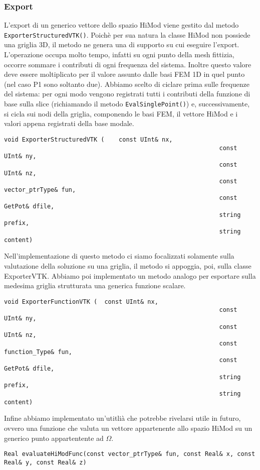 \subsubsection{Export}

L'export di un generico vettore dello spazio HiMod viene gestito dal metodo \texttt{ExporterStructuredVTK()}. Poich\`e  per sua natura la classe HiMod non possiede una griglia 3D,  il metodo ne genera una di supporto su cui eseguire l'export. 
L'operazione occupa molto tempo, infatti su ogni punto della mesh fittizia, 
occorre sommare i contributi di ogni frequenza del sistema. 
Inoltre questo valore deve essere moltiplicato per il valore assunto dalle basi FEM 1D in quel punto (nel caso P1 sono soltanto due).
Abbiamo scelto di ciclare prima sulle frequenze del sistema: per ogni modo vengono registrati 
tutti i contributi della funzione di base sulla slice (richiamando il metodo \texttt{EvalSinglePoint()}) 
e, successivamente, si cicla sui nodi della griglia, componendo le basi FEM, il vettore HiMod e 
i valori appena registrati della base modale.

\begin{lstlisting}[style = general,frame=none]
void ExporterStructuredVTK (	const UInt& nx,
															const UInt& ny,
															const UInt& nz,
															const vector_ptrType& fun,
															const GetPot& dfile, 
															string prefix,
															string content)
\end{lstlisting}

Nell'implementazione di questo metodo ci siamo focalizzati
solamente sulla valutazione della soluzione su una griglia, il metodo si appoggia, poi, sulla classe ExporterVTK.
Abbiamo poi implementato un metodo analogo per esportare sulla medesima griglia strutturata una generica funzione scalare.

\begin{lstlisting}[style = general,frame=none]
void ExporterFunctionVTK (	const UInt& nx,
															const UInt& ny,
															const UInt& nz,
															const function_Type& fun,
															const GetPot& dfile, 
															string prefix,
															string content)
\end{lstlisting}

Infine abbiamo implementato un'utitli\`a che potrebbe rivelarsi utile in futuro, 
ovvero una funzione che valuta un vettore appartenente allo spazio HiMod  su un generico punto appartentente ad $\Omega$.

\begin{lstlisting}[style = general,frame=none]
Real evaluateHiModFunc(const vector_ptrType& fun, const Real& x, const Real& y, const Real& z)
\end{lstlisting}